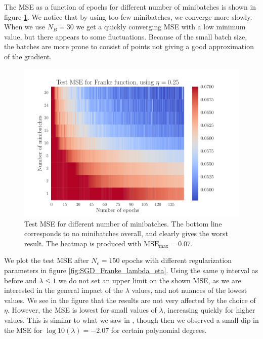 \documentclass[12pt]{extarticle}
\begin{document}
The MSE as a function of epochs for different number of minibatches is shown in figure \ref{fig:SGD_Franke_epochs_minibatches}. We notice that by using too few minibatches, we converge more slowly. When we use $N_B=30$ we get a quickly converging MSE with a low minimum value, but there appears to some fluctuations. Because of the small batch size, the batches are more prone to consist of points not giving a good approximation of the gradient.

\begin{figure}[h!]
	\includegraphics[width=0.9\linewidth]{SGD_Franke/reg_Franke__epochs_minibatches__Test_MSE__440533.pdf}
	\caption{Test MSE for different number of minibatches. The bottom line corresponds to no minibatches overall, and clearly gives the worst result. The heatmap is produced with $\mathrm{MSE}_\mathrm{max}=0.07$.}
	\label{fig:SGD_Franke_epochs_minibatches}
\end{figure}

We plot the test MSE after $N_e=150$ epochs with different regularization parameters in figure \ref{fig:SGD_Franke_lambda_eta}. Using the same $\eta$ interval as before and $\lambda\leq1$ we do not set an upper limit on the shown MSE, as we are interested in the general impact of the $\lambda$ values, and not nuances of the lowest values. We see in the figure that the results are not very affected by the choice of $\eta$. However, the MSE is lowest for small values of $\lambda$, increasing quickly for higher values. This is similar to what we saw in \cite{project1}, though then we observed a small dip in the MSE for $\log10(\lambda)=-2.07$ for certain polynomial degrees.
\end{document}
